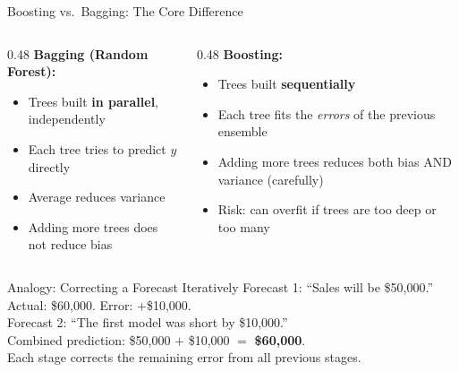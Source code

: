 \documentclass[aspectratio=169, 11pt]{beamer}
\begin{document}

\begin{frame}{Boosting vs.\ Bagging: The Core Difference}
  \begin{columns}[T]
    \begin{column}{0.48\textwidth}
      \textbf{Bagging (Random Forest):}
      \begin{itemize}\small
        \item Trees built \textbf{in parallel}, independently
        \item Each tree tries to predict $y$ directly
        \item Average reduces variance
        \item Adding more trees does not reduce bias
      \end{itemize}
    \end{column}
    \begin{column}{0.48\textwidth}
      \textbf{Boosting:}
      \begin{itemize}\small
        \item Trees built \textbf{sequentially}
        \item Each tree fits the \emph{errors} of the previous ensemble
        \item Adding more trees reduces both bias AND variance (carefully)
        \item Risk: can overfit if trees are too deep or too many
      \end{itemize}
    \end{column}
  \end{columns}
  \vspace{0.1cm}
  \begin{examplebox}{Analogy: Correcting a Forecast Iteratively}
    \small
    Forecast 1: ``Sales will be \$50,000.'' \quad Actual: \$60,000. \quad Error: $+$\$10,000.\\[2pt]
    Forecast 2: ``The first model was short by \$10,000.''\\
    Combined prediction: \$50,000 $+$ \$10,000 $=$ \textbf{\$60,000}.\\[2pt]
    Each stage corrects the remaining error from all previous stages.
  \end{examplebox}
\end{frame}
\end{document}
